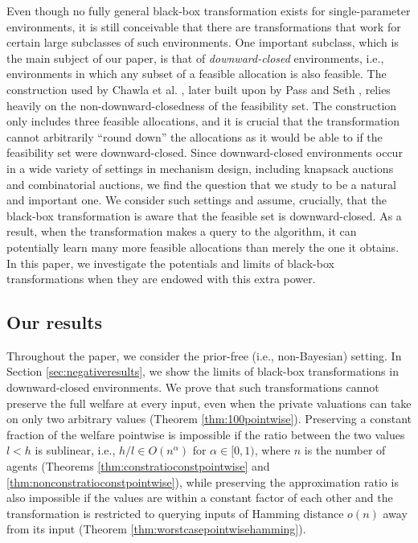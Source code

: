 \documentclass[runningheads,a4paper]{llncs}
\begin{document}
Even though no fully general black-box transformation exists for single-parameter environments, it is still conceivable that there are transformations that work for certain large subclasses of such environments. One important subclass, which is the main subject of our paper, is that of \emph{downward-closed} environments, i.e., environments in which any subset of a feasible allocation is also feasible. The construction used by Chawla et al. \cite{ChawlaImLu12}, later built upon by Pass and Seth \cite{PassSe14}, relies heavily on the non-downward-closedness of the feasibility set. The construction only includes three feasible allocations, and it is crucial that the transformation cannot arbitrarily ``round down'' the allocations as it would be able to if the feasibility set were downward-closed. Since downward-closed environments occur in a wide variety of settings in mechanism design, including knapsack auctions and combinatorial auctions, we find the question that we study to be a natural and important one. We consider such settings and assume, crucially, that the black-box transformation is aware that the feasible set is downward-closed. As a result, when the transformation makes a query to the algorithm, it can potentially learn many more feasible allocations than merely the one it obtains. In this paper, we investigate the potentials and limits of black-box transformations when they are endowed with this extra power.

\subsection{Our results}

Throughout the paper, we consider the prior-free (i.e., non-Bayesian) setting. In Section \ref{sec:negativeresults}, we show the limits of black-box transformations in downward-closed environments. We prove that such transformations cannot preserve the full welfare at every input, even when the private valuations can take on only two arbitrary values (Theorem \ref{thm:100pointwise}). Preserving a constant fraction of the welfare pointwise is impossible if the ratio between the two values $l<h$ is sublinear, i.e., $h/l\in O(n^\alpha)$ for $\alpha\in[0,1)$, where $n$ is the number of agents (Theorems \ref{thm:constratioconstpointwise} and \ref{thm:nonconstratioconstpointwise}), while preserving the approximation ratio is also impossible if the values are within a constant factor of each other and the transformation is restricted to querying inputs of Hamming distance $o(n)$ away from its input (Theorem \ref{thm:worstcasepointwisehamming}). 
\end{document}
